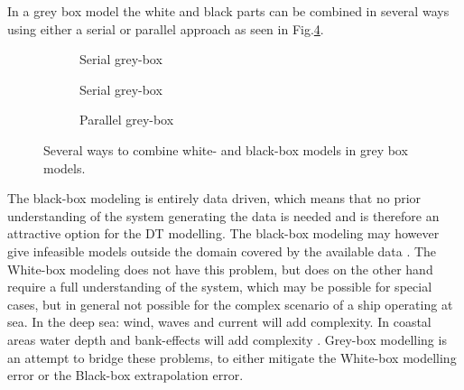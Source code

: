\noindent In a grey box model the white and black parts can be combined in several ways using either a serial or parallel approach \cite{leifsson_grey-box_2008} as seen in Fig.\ref{fig:greycombinations}. 

\begin{figure}[H]
    \centering
    \begin{subfigure}[b]{0.3\textwidth}
    \centering
    \caption{Serial grey-box}
    \label{fig:serial1}
    \end{subfigure}

    
    \begin{subfigure}[b]{0.3\textwidth}
    \centering
    \caption{Serial grey-box}
    \label{fig:serial2}
    \end{subfigure}

    \begin{subfigure}[b]{0.3\textwidth}
    \centering
    \caption{Parallel grey-box}
    \label{fig:parallel}
    \end{subfigure}
    \caption{Several ways to combine white- and black-box models in grey box models.}
    \label{fig:greycombinations}
\end{figure}

\noindent The black-box modeling is entirely data driven, which means that no prior understanding of the system generating the data is needed and is therefore an attractive option for the DT modelling. The black-box modeling may however give infeasible models outside the domain covered by the available data \cite{nielsen_machine_2022}. The White-box modeling does not have this problem, but does on the other hand require a full understanding of the system, which may be possible for special cases, but in general not possible for the complex scenario of a ship operating at sea. In the deep sea: wind, waves and current will add complexity. In coastal areas water depth and bank-effects will add complexity \cite{nielsen_machine_2022}. 
\noindent Grey-box modelling is an attempt to bridge these problems, to either mitigate the White-box modelling error or the Black-box extrapolation error.

